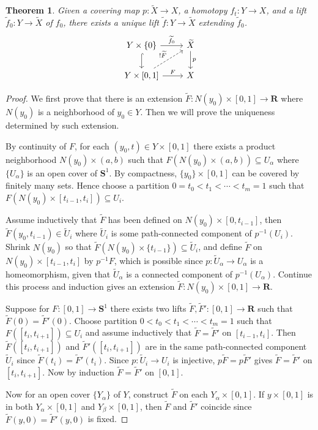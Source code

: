 \documentclass[11pt]{article}
\theoremstyle{definition}
\theoremstyle{plain}
\newtheorem{theorem}{Theorem}[section]
\theoremstyle{remark}
\newcommand{\R}{\mathbf{R}}
\begin{document}
\begin{theorem}
Given a covering map $p:\widetilde{X}\to X$, a homotopy $f_t:Y\to X$, and a lift $\widetilde{f}_0:Y\to\widetilde{X}$ of $f_0$, there exists a unique lift $\widetilde{f}:Y\to\widetilde{X}$ extending $\widetilde{f}_0$.
\[\begin{tikzcd}
Y\times\{0\}\arrow{r}{\widetilde{f}_0}\arrow[hookrightarrow]{d}&\widetilde{X}\arrow{d}{p}\\
Y\times[0,1]\arrow{r}{F}\arrow[dashed]{ur}{!\widetilde{F}}&X
\end{tikzcd}\]
\end{theorem}
\begin{proof}
We first prove that there is an extension $\widetilde{F}:N(y_0)\times[0,1]\to\R$ where $N(y_0)$ is a neighborhood of $y_0\in Y$. Then we will prove the uniqueness determined by such extension.\medbreak

By continuity of $F$, for each $(y_0,t)\in Y\times[0,1]$ there exists a product neighborhood $N(y_0)\times(a,b)$ such that $F(N(y_0)\times(a,b))\subseteq U_\alpha$ where $\{U_\alpha\}$ is an open cover of $\mathbf{S}^1$. By compactness, $\{y_0\}\times[0,1]$ can be covered by finitely many sets. Hence choose a partition $0=t_0<t_1<\cdots<t_m=1$ such that $F(N(y_0)\times[t_{i-1},t_i])\subseteq U_i$.\medbreak

Assume inductively that $\widetilde{F}$ has been defined on $N(y_0)\times[0,t_{i-1}]$, then $\widetilde{F}(y_0,t_{i-1})\in\widetilde{U}_i$ where $\widetilde{U}_i$ is some path-connected component of $p^{-1}(U_i)$. Shrink $N(y_0)$ so that $\widetilde{F}(N(y_0)\times\{t_{i-1}\})\subseteq\widetilde{U}_i$, and define $\widetilde{F}$ on $N(y_0)\times[t_{i-1},t_i]$ by $p^{-1}F$, which is possible since $p:\widetilde{U}_\alpha\to U_\alpha$ is a homeomorphism, given that $\widetilde{U}_\alpha$ is a connected component of $p^{-1}(U_\alpha)$. Continue this process and induction gives an extension $\widetilde{F}:N(y_0)\times[0,1]\to\R$.\medbreak

Suppose for $F:[0,1]\to\mathbf{S}^1$ there exists two lifts $\widetilde{F},\widetilde{F}':[0,1]\to\R$ such that $\widetilde{F}(0)=\widetilde{F}'(0)$. Choose partition $0<t_0<t_1<\cdots<t_m=1$ such that $F([t_i,t_{i+1}])\subseteq U_i$ and assume inductively that $\widetilde{F}=\widetilde{F}'$ on $[t_{i-1},t_i]$. Then $\widetilde{F}([t_i,t_{i+1}])$ and $\widetilde{F}'([t_i,t_{i+1}])$ are in the same path-connected component $\widetilde{U}_i$ since $\widetilde{F}(t_i)=\widetilde{F}'(t_i)$. Since $p:\widetilde{U}_i\to U_i$ is injective, $p\widetilde{F}=p\widetilde{F}'$ gives $\widetilde{F}=\widetilde{F}'$ on $[t_i,t_{i+1}]$. Now by induction $\widetilde{F}=\widetilde{F}'$ on $[0,1]$.\medbreak

Now for an open cover $\{Y_\alpha\}$ of $Y$, construct $\widetilde{F}$ on each $Y_\alpha\times[0,1]$. If $y\times[0,1]$ is in both $Y_\alpha\times[0,1]$ and $Y_\beta\times[0,1]$, then $\widetilde{F}$ and $\widetilde{F}'$ coincide since $\widetilde{F}(y,0)=\widetilde{F}'(y,0)$ is fixed.
\end{proof}
\end{document}
